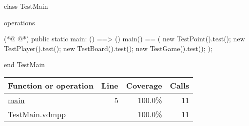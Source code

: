 \begin{vdmpp}[breaklines=true]
class TestMain

operations
 
(*@
\label{main:5}
@*)
 public static main: () ==> ()
 main() ==
 (
  new TestPoint().test();
  new TestPlayer().test();
  new TestBoard().test();
  new TestGame().test();
 );

end TestMain
\end{vdmpp}
\bigskip
\begin{longtable}{|l|r|r|r|}
\hline
Function or operation & Line & Coverage & Calls \\
\hline
\hline
\hyperref[main:5]{main} & 5&100.0\% & 11 \\
\hline
\hline
TestMain.vdmpp & & 100.0\% & 11 \\
\hline
\end{longtable}

